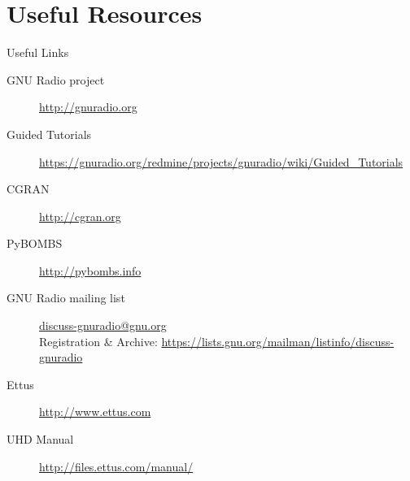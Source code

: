 \documentclass{beamer}
\begin{document}
\section{Useful Resources}
\begin{frame}{Useful Links}
  \begin{description}
    \item[GNU Radio project] \url{http://gnuradio.org}
    \item[Guided Tutorials] \url{https://gnuradio.org/redmine/projects/gnuradio/wiki/Guided_Tutorials}
    \item[CGRAN] \url{http://cgran.org}
    \item[PyBOMBS]\url{http://pybombs.info}\\[1.5em]
    \item[GNU Radio mailing list] \href{mailto:discuss-gnuradio@gnu.org}{discuss-gnuradio@gnu.org}\\
      Registration \& Archive: \url{https://lists.gnu.org/mailman/listinfo/discuss-gnuradio}\\[1.5em]
    \item[Ettus] \url{http://www.ettus.com}
    \item[UHD Manual] \url{http://files.ettus.com/manual/}
  \end{description}
\end{frame}
\end{document}
